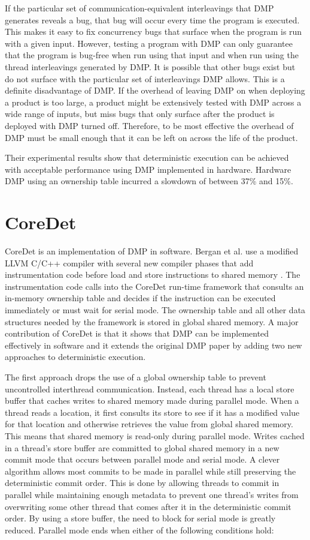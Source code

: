 If the particular set of communication-equivalent interleavings that
DMP generates reveals a bug, that bug will occur every time the
program is executed.  This makes it easy to fix concurrency bugs that
surface when the program is run with a given input.  However, testing
a program with DMP can only guarantee that the program is bug-free
when run using that input and when run using the thread interleavings
generated by DMP.  It is possible that other bugs exist but do not
surface with the particular set of interleavings DMP allows.  This is
a definite disadvantage of DMP.  If the overhead of leaving DMP on
when deploying a product is too large, a product might be extensively
tested with DMP across a wide range of inputs, but miss bugs that only
surface after the product is deployed with DMP turned off.  Therefore,
to be most effective the overhead of DMP must be small enough that it
can be left on across the life of the product.

Their experimental results show that deterministic execution can be
achieved with acceptable performance using DMP implemented in
hardware.  Hardware DMP using an ownership table incurred a slowdown
of between 37\% and 15\%.

\section{CoreDet}

CoreDet is an implementation of DMP in software.  Bergan et al. use a
modified LLVM C/C++ compiler with several new compiler phases that add
instrumentation code before load and store instructions to shared
memory \cite{coredet}.  The instrumentation code calls into the
CoreDet run-time framework that consults an in-memory ownership table
and decides if the instruction can be executed immediately or must
wait for serial mode.  The ownership table and all other data
structures needed by the framework is stored in global shared memory.
A major contribution of CoreDet is that it shows that DMP can be
implemented effectively in software and it extends the original DMP
paper by adding two new approaches to deterministic execution.

The first approach drops the use of a global ownership table to
prevent uncontrolled interthread communication.  Instead, each thread
has a local store buffer that caches writes to shared memory made
during parallel mode.  When a thread reads a location, it first
consults its store to see if it has a modified value for that location
and otherwise retrieves the value from global shared memory.  This
means that shared memory is read-only during parallel mode.  Writes
cached in a thread's store buffer are committed to global shared
memory in a new commit mode that occurs between parallel mode and
serial mode.  A clever algorithm allows most commits to be made in
parallel while still preserving the deterministic commit order.  This
is done by allowing threads to commit in parallel while maintaining
enough metadata to prevent one thread's writes from overwriting some
other thread that comes after it in the deterministic commit order.
By using a store buffer, the need to block for serial mode is greatly
reduced.  Parallel mode ends when either of the following conditions
hold:

